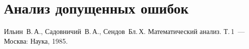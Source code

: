 \documentclass[a4paper,12pt,titlepage,finall]{article}
\begin{document}
\section{Анализ допущенных ошибок}

\newpage
\begin{raggedright}
\begin{thebibliography}{99}
 Ильин~В.\,А., Садовничий~В.\,А., Сендов~Бл.\,Х. Математический анализ. Т.\,1~---
    Москва: Наука, 1985.
\end{thebibliography}
\end{raggedright}

\newpage
\end{document}
